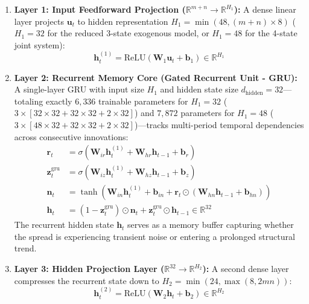 \documentclass[11pt, a4paper]{article}
\begin{document}
\begin{enumerate}
    \item \textbf{Layer 1: Input Feedforward Projection ($\mathbb{R}^{m+n} \to \mathbb{R}^{H_1}$):}  
    A dense linear layer projects $\mathbf{u}_t$ to hidden representation $H_1 = \min(48, (m+n)\times 8)$ ($H_1 = 32$ for the reduced 3-state exogenous model, or $H_1 = 48$ for the 4-state joint system):
    \begin{equation}
        \mathbf{h}_t^{(1)} = \text{ReLU}\left( \mathbf{W}_1 \mathbf{u}_t + \mathbf{b}_1 \right) \in \mathbb{R}^{H_1}
    \end{equation}

    \item \textbf{Layer 2: Recurrent Memory Core (Gated Recurrent Unit - GRU):}  
    A single-layer GRU with input size $H_1$ and hidden state size $d_{\text{hidden}} = 32$—totaling exactly $6{,}336$ trainable parameters for $H_1 = 32$ ($3 \times [32 \times 32 + 32 \times 32 + 2 \times 32]$) and $7{,}872$ parameters for $H_1 = 48$ ($3 \times [48 \times 32 + 32 \times 32 + 2 \times 32]$)—tracks multi-period temporal dependencies across consecutive innovations:
    \begin{align}
        \mathbf{r}_t &= \sigma\left( \mathbf{W}_{ir} \mathbf{h}_t^{(1)} + \mathbf{W}_{hr} \mathbf{h}_{t-1} + \mathbf{b}_r \right) \\
        \mathbf{z}_t^{\text{gru}} &= \sigma\left( \mathbf{W}_{iz} \mathbf{h}_t^{(1)} + \mathbf{W}_{hz} \mathbf{h}_{t-1} + \mathbf{b}_z \right) \\
        \mathbf{n}_t &= \tanh\left( \mathbf{W}_{in} \mathbf{h}_t^{(1)} + \mathbf{b}_{in} + \mathbf{r}_t \odot (\mathbf{W}_{hn} \mathbf{h}_{t-1} + \mathbf{b}_{hn}) \right) \\
        \mathbf{h}_t &= (1 - \mathbf{z}_t^{\text{gru}}) \odot \mathbf{n}_t + \mathbf{z}_t^{\text{gru}} \odot \mathbf{h}_{t-1} \in \mathbb{R}^{32}
    \end{align}
    The recurrent hidden state $\mathbf{h}_t$ serves as a memory buffer capturing whether the spread is experiencing transient noise or entering a prolonged structural trend.

    \item \textbf{Layer 3: Hidden Projection Layer ($\mathbb{R}^{32} \to \mathbb{R}^{H_2}$):}  
    A second dense layer compresses the recurrent state down to $H_2 = \min(24, \max(8, 2mn))$:
    \begin{equation}
        \mathbf{h}_t^{(2)} = \text{ReLU}\left( \mathbf{W}_2 \mathbf{h}_t + \mathbf{b}_2 \right) \in \mathbb{R}^{H_2}
    \end{equation}


\end{enumerate}
\end{document}
